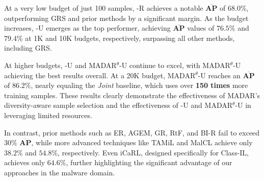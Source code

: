 At a very low budget of just 100 samples, \system-R achieves a notable $\mathbf{\overline{AP}}$ of $68.0\%$, outperforming GRS and prior methods by a significant margin. As the budget increases, \system-U emerges as the top performer, achieving $\mathbf{\overline{AP}}$ values of $76.5\%$ and $79.4\%$ at 1K and 10K budgets, respectively, surpassing all other methods, including GRS. 


At higher budgets, \system-U and MADAR$^\theta$-U continue to excel, with MADAR$^\theta$-U achieving the best results overall. At a 20K budget, MADAR$^\theta$-U reaches an $\mathbf{\overline{AP}}$ of $86.2\%$, nearly equaling the \textit{Joint} baseline, which uses over {\bf 150 times} more training samples. These results clearly demonstrate the effectiveness of MADAR's diversity-aware sample selection and the effectiveness of \system-U and MADAR$^\theta$-U in leveraging limited resources.

In contrast, prior methods such as ER, AGEM, GR, RtF, and BI-R fail to exceed 30\% $\mathbf{\overline{AP}}$, while more advanced techniques like TAMiL and MalCL achieve only $38.2\%$ and $54.8\%$, respectively. Even iCaRL, designed specifically for Class-IL, achieves only $64.6\%$, further highlighting the significant advantage of our approaches in the malware domain.






